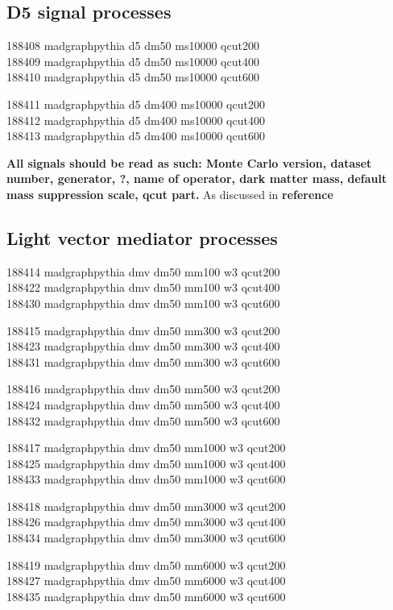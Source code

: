 \subsection{D5 signal processes}
188408 madgraphpythia    d5  dm50  ms10000  qcut200\\
188409 madgraphpythia    d5  dm50  ms10000  qcut400\\
188410 madgraphpythia    d5  dm50  ms10000  qcut600

188411 madgraphpythia    d5  dm400  ms10000  qcut200\\
188412 madgraphpythia    d5  dm400  ms10000  qcut400\\
188413 madgraphpythia    d5  dm400  ms10000  qcut600

\textbf{All signals should be read as such: Monte Carlo version, dataset number, generator, ?, name of operator,  dark matter mass, default mass suppression scale, qcut part.} As discussed in \textbf{reference} 
\subsection{Light vector mediator processes}\label{livecmedpro}
188414 madgraphpythia  dmv dm50 mm100 w3 qcut200\\ 188422 madgraphpythia  dmv dm50 mm100 w3 qcut400\\
188430 madgraphpythia  dmv dm50 mm100 w3 qcut600
 
188415 madgraphpythia  dmv dm50 mm300 w3 qcut200\\
188423 madgraphpythia  dmv dm50 mm300 w3 qcut400\\
188431 madgraphpythia  dmv dm50 mm300 w3 qcut600

188416 madgraphpythia  dmv dm50 mm500 w3 qcut200\\
188424 madgraphpythia  dmv dm50 mm500 w3 qcut400\\
188432 madgraphpythia  dmv dm50 mm500 w3 qcut600

188417 madgraphpythia  dmv dm50 mm1000 w3 qcut200\\
188425 madgraphpythia  dmv dm50 mm1000 w3 qcut400\\
188433 madgraphpythia  dmv dm50 mm1000 w3 qcut600

188418 madgraphpythia  dmv dm50 mm3000 w3 qcut200\\
188426 madgraphpythia  dmv dm50 mm3000 w3 qcut400\\
188434 madgraphpythia  dmv dm50 mm3000 w3 qcut600

188419 madgraphpythia  dmv dm50 mm6000 w3 qcut200\\
188427 madgraphpythia  dmv dm50 mm6000 w3 qcut400\\
188435 madgraphpythia  dmv dm50 mm6000 w3 qcut600

